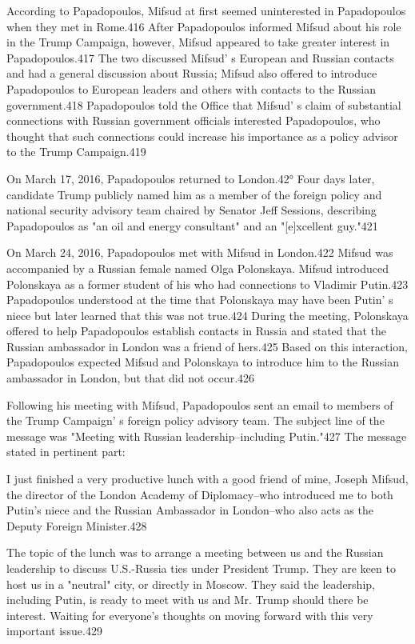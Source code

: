 According to Papadopoulos,  Mifsud at first seemed uninterested in Papadopoulos when they met in Rome.416 After Papadopoulos informed Mifsud about his role in the Trump Campaign, however, Mifsud appeared to take greater interest in Papadopoulos.417 The two discussed Mifsud' s European and Russian contacts and had a general discussion about Russia; Mifsud also offered to introduce Papadopoulos to European leaders and others with contacts to the Russian government.418 Papadopoulos told the Office that Mifsud' s claim of substantial connections with Russian government officials interested Papadopoulos, who thought that such connections could increase his importance as a policy advisor to the Trump Campaign.419

On March 17, 2016, Papadopoulos returned to London.42° Four days later, candidate Trump publicly named him as a member of the foreign policy and national security advisory team chaired by Senator Jeff Sessions, describing Papadopoulos as "an oil and energy consultant" and an "[e]xcellent guy."421

On March 24, 2016, Papadopoulos met with Mifsud in London.422 Mifsud was accompanied by a  Russian female named Olga Polonskaya. Mifsud introduced Polonskaya as a former student of his who had connections to Vladimir Putin.423 Papadopoulos understood at the time that Polonskaya may have been Putin' s niece but later learned that this was not true.424 During the meeting, Polonskaya offered to help Papadopoulos establish contacts in Russia and stated that the Russian ambassador in London was a friend of hers.425 Based on this interaction, Papadopoulos expected Mifsud and Polonskaya to introduce him to the Russian ambassador in London, but that did not occur.426

Following his meeting with Mifsud, Papadopoulos sent an email to members of the Trump Campaign' s  foreign policy advisory team. The subject line of the message was "Meeting with Russian leadership--including Putin."427 The message stated in pertinent part:

I just finished a  very productive lunch with a  good friend of mine, Joseph Mifsud, the director of the London Academy of Diplomacy--who introduced me to both Putin's niece and the Russian Ambassador in London--who also acts as the Deputy Foreign Minister.428

The topic of the lunch was to arrange a  meeting between us and the Russian leadership to discuss U.S.-Russia ties under President Trump. They are keen to host us in a  "neutral" city, or directly in Moscow. They said the leadership, including Putin, is ready to meet with us and Mr. Trump should there be interest. Waiting for everyone's thoughts on moving forward with this very important issue.429

